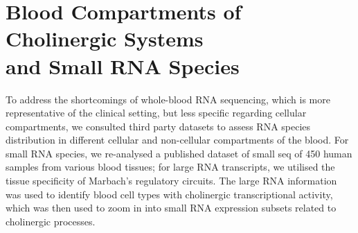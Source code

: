 \section[Blood Compartments of Cholinergic Systems and Small RNA Species]{Blood Compartments of Cholinergic Systems \\and Small RNA Species} \label{sec:stroke:celltypes}
To address the shortcomings of whole-blood RNA sequencing, which is more representative of the clinical setting, but less specific regarding cellular compartments, we consulted third party datasets to assess RNA species distribution in different cellular and non-cellular compartments of the blood. For small RNA species, we re-analysed a published dataset of small \ac{seq} of 450 human samples from various blood tissues;\cite{Juzenas2017} for large RNA transcripts, we utilised the tissue specificity of Marbach's regulatory circuits.\cite{Marbach2016} The large RNA information was used to identify blood cell types with cholinergic transcriptional activity, which was then used to zoom in into small RNA expression subsets related to cholinergic processes.

